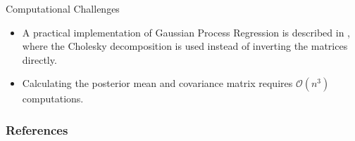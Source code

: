 \documentclass[10pt]{beamer}
\begin{document}
\begin{frame}{Computational Challenges}
\begin{itemize}
\item A practical implementation of Gaussian Process Regression is described in \cite[Algorithm 2.1]{RW05}, where the Cholesky decomposition is used instead of inverting the matrices directly. 
\item Calculating the posterior mean and covariance matrix requires $\mathcal{O}(n^3)$ computations. 
\end{itemize}
\end{frame}



\begin{frame}[t, allowframebreaks]
\frametitle{References}
\footnotesize{

 
}
\end{frame}
\end{document}
